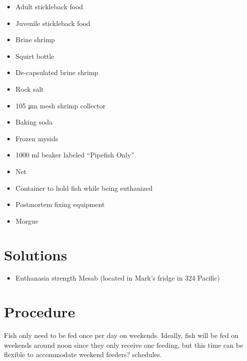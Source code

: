 \documentclass[
  letterpaper,
  DIV=11,
  numbers=noendperiod]{scrreprt}
\providecommand{\tightlist}{%
  \setlength{\itemsep}{0pt}\setlength{\parskip}{0pt}}\usepackage{longtable,booktabs,array}
\begin{document}
\begin{itemize}
\tightlist
\item
  Adult stickleback food
\item
  Juvenile stickleback food
\item
  Brine shrimp
\item
  Squirt bottle
\item
  De-capsulated brine shrimp
\item
  Rock salt
\item
  105 μm mesh shrimp collector
\item
  Baking soda
\item
  Frozen mysids
\item
  1000 ml beaker labeled ``Pipefish Only''
\item
  Net
\item
  Container to hold fish while being euthanized
\item
  Postmortem fixing equipment
\item
  Morgue
\end{itemize}

\hypertarget{solutions-36}{%
\section{Solutions}\label{solutions-36}}

\begin{itemize}
\tightlist
\item
  Euthanasia strength Mesab (located in Mark's fridge in 324 Pacific)
\end{itemize}

\hypertarget{procedure-46}{%
\section{Procedure}\label{procedure-46}}

\begin{tcolorbox}[enhanced jigsaw, rightrule=.15mm, title=\textcolor{quarto-callout-warning-color}{\faExclamationTriangle}\hspace{0.5em}{NOTES}, titlerule=0mm, opacitybacktitle=0.6, toprule=.15mm, bottomrule=.15mm, opacityback=0, left=2mm, colframe=quarto-callout-warning-color-frame, breakable, coltitle=black, colback=white, colbacktitle=quarto-callout-warning-color!10!white, bottomtitle=1mm, leftrule=.75mm, toptitle=1mm, arc=.35mm]

Fish only need to be fed once per day on weekends. Ideally, fish will be
fed on weekends around noon since they only receive one feeding, but
this time can be flexible to accommodate weekend feeders? schedules.

\end{tcolorbox}
\end{document}
